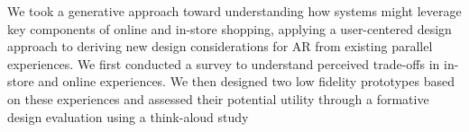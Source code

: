 

We took a generative approach toward understanding how systems might leverage key components of online and in-store shopping,
applying
a user-centered design approach to deriving new design considerations for AR from existing parallel experiences. We first conducted a survey to understand perceived trade-offs in in-store and online experiences. 
We then designed two low fidelity prototypes based on these experiences and assessed their potential utility through a formative design evaluation using a think-aloud study %
